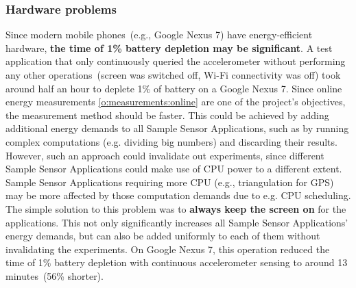 \subsubsection{Hardware problems}
\hspace{10pt} Since modern mobile phones\ (e.g., Google Nexus 7) have energy-efficient hardware, \textbf{the time of 1\% battery depletion may be significant}. A test application that only continuously queried the accelerometer without performing any other operations\ (screen was switched off, Wi-Fi connectivity was off) took around half an hour to deplete 1\% of battery on a Google Nexus 7. Since online energy measurements \ref{o:measurements:online} are one of the project's objectives, the measurement method should be faster. This could be achieved by adding additional energy demands to all Sample Sensor Applications, such as by running complex computations (e.g. dividing big numbers) and discarding their results. However, such an approach could invalidate out experiments, since different Sample Sensor Applications could make use of CPU power to a different extent. Sample Sensor Applications requiring more CPU (e.g., triangulation for GPS) may be more affected by those computation demands due to e.g. CPU scheduling. The simple solution to this problem was to \textbf{always keep the screen on} for the applications. This not only significantly increases  all Sample Sensor Applications' energy demands, but can also be added uniformly to each of them without invalidating the experiments. On Google Nexus 7, this operation reduced the time of 1\% battery depletion with continuous accelerometer sensing to around 13 minutes\ (56\% shorter). 

